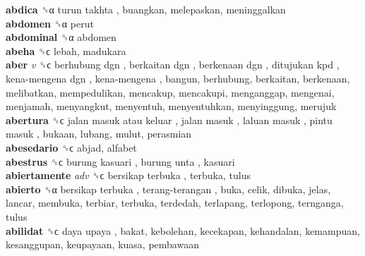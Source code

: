\textbf{abdica} ␝α   turun takhta , buangkan, melepaskan, meninggalkan  \\
\textbf{abdomen} ␝α  perut  \\
\textbf{abdominal} ␝α  abdomen  \\
\textbf{abeha} ␝ϲ  lebah, madukara  \\
\textbf{aber} \emph{v}  ␝ϲ   berhubung dgn ,  berkaitan dgn ,  berkenaan dgn ,  ditujukan kpd ,  kena-mengena dgn ,  kena-mengena , bangun, berhubung, berkaitan, berkenaan, melibatkan, mempedulikan, mencakup, mencakupi, menganggap, mengenai, menjamah, menyangkut, menyentuh, menyentuhkan, menyinggung, merujuk  \\
\textbf{abertura} ␝ϲ   jalan masuk atau keluar ,  jalan masuk ,  laluan masuk ,  pintu masuk , bukaan, lubang, mulut, perasmian  \\
\textbf{abesedario} ␝ϲ  abjad, alfabet  \\
\textbf{abestrus} ␝ϲ   burung kasuari ,  burung unta , kasuari  \\
\textbf{abiertamente} \emph{adv}  ␝ϲ   bersikap terbuka , terbuka, tulus  \\
\textbf{abierto} ␝α   bersikap terbuka ,  terang-terangan , buka, celik, dibuka, jelas, lancar, membuka, terbiar, terbuka, terdedah, terlapang, terlopong, ternganga, tulus  \\
\textbf{abilidat} ␝ϲ   daya upaya , bakat, kebolehan, kecekapan, kehandalan, kemampuan, kesanggupan, keupayaan, kuasa, pembawaan  \\
